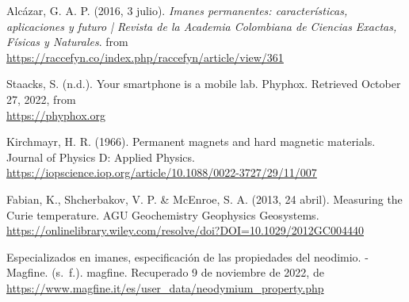 \begin{thebibliography}{}


 Alcázar, G. A. P. (2016, 3 julio). \textit{ Imanes permanentes: características, aplicaciones y futuro | Revista de la Academia Colombiana de Ciencias Exactas, Físicas y Naturales}.  from \\
\hyperlink{https://raccefyn.co/index.php/raccefyn/article/view/361}{https://raccefyn.co/index.php/raccefyn/article/view/361}

 Staacks, S. (n.d.). Your smartphone is a mobile lab. Phyphox. Retrieved October 27, 2022, from \\
\hyperlink{https://phyphox.org}{https://phyphox.org}

 Kirchmayr, H. R. (1966). Permanent magnets and hard magnetic materials. Journal of Physics D: Applied Physics. 
\hyperlink{https://iopscience.iop.org/article/10.1088/0022-3727/29/11/007}{https://iopscience.iop.org/article/10.1088/0022-3727/29/11/007}


 Fabian, K., Shcherbakov, V. P. \& McEnroe, S. A. (2013, 24 abril). Measuring the Curie temperature. AGU \-Geochemistry Geophysics Geosystems.\\
\hyperlink{https://onlinelibrary.wiley.com/resolve/doi?DOI=10.1029/2012GC004440}{https://onlinelibrary.wiley.com/resolve/doi?DOI=10.1029/2012GC004440}

Especializados en imanes, especificación de las propiedades del neodimio. - Magfine. (s. f.). magfine. Recuperado 9 de noviembre de 2022, de \\
\hyperlink{https://www.magfine.it/es/user\_data/neodymium\_property.php}{https://www.magfine.it/es/user\_data/neodymium\_property.php}





\end{thebibliography}